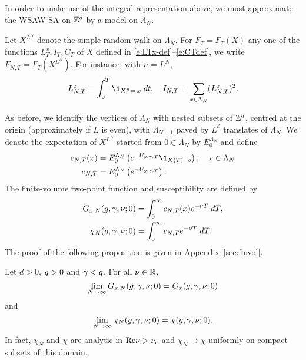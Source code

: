 In order to make use of the integral representation above, we must approximate the
WSAW-SA on ${ {{\mathbb Z}}^d }$ by a model on $\Lambda_N$.

Let $X^{L^N}$ denote the simple random walk on $\Lambda_N$.
For $F_T = F_T(X)$ any one of the functions $L_T^x,I_T,C_T$
of $X$ defined in \eqref{e:LTx-def}--\eqref{e:CTdef},
we write $F_{N,T} = F_T(X^{L^N})$. For instance, with $n=L^N$,
\begin{equation}
    L^x_{N,T} = \int_0^T \1_{X^{n}_t=\;x} \; dt,
    \quad I_{N,T} = \sum_{x \in \Lambda_N}(L_{N,T}^x)^2 .
\end{equation}

As before, we identify the vertices of $\Lambda_N$ with nested subsets of ${ {{\mathbb Z}}^d }$,
centred at the origin (approximately if $L$ is even),
with $\Lambda_{N+1}$ paved by $L^d$ translates of $\Lambda_N$.
We denote the expectation of $X^{L^N}$ started from $0 \in \Lambda_N$ by $E^{\Lambda_N}_0$
and define
\begin{align}
\label{e:cN}
c_{N,T}(x)
    &= E^{\Lambda_N}_0 \left( e^{-U_{\gcc,\gamma,T}} \1_{X(T)=b} \right),
    \quad x \in \Lambda_N \\
c_{N,T}
    &= E^{\Lambda_N}_0 \left( e^{-U_{\gcc,\gamma,T}} \right).
\end{align}
The finite-volume two-point function and susceptibility
are defined by
\begin{align}
G_{x,N}(g,\gamma,\nu; 0)
    &=
\int_0^\infty c_{N,T}(x) e^{-\nu T} \; dT, \\
\label{e:chiNdef-pre}
\chi_N(g, \gamma, \nu; 0)
    &=
\int_0^\infty c_{N,T} e^{-\nu T} \; dT.
\end{align}
The proof of the following proposition is given in Appendix~\ref{sec:finvol}.

\begin{prop}
\label{prop:finvol}
Let $d >0$, $g >0$ and $\gamma < g$. For all $\nu \in {\mathbb R}$,
\begin{equation}
\label{e:Givlc}
\lim_{N \rightarrow \infty}
G_{x,N}(g,\gamma,\nu; 0)
=
G_x(g,\gamma,\nu; 0)
\end{equation}
and
\begin{equation}
\label{e:chilim-pre}
\lim_{N\rightarrow\infty}\chi_N(g,\gamma,\nu; 0) =   \chi(g,\gamma,\nu; 0).
\end{equation}
In fact, $\chi_N$ and $\chi$ are analytic in ${\rm Re} \nu > \nu_c$ and
$\chi_N \to \chi$ uniformly on compact subsets of this domain.
\end{prop}



